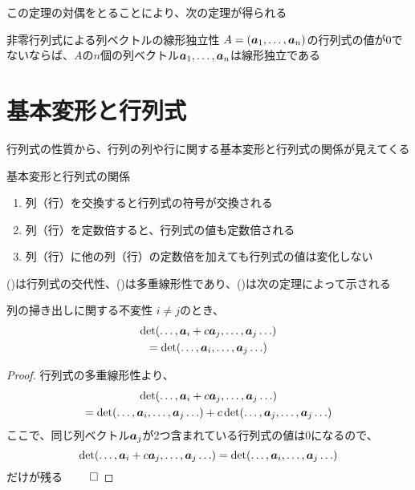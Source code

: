 \documentclass[../../../topic_linear-algebra]{subfiles}
\begin{document}
この定理の対偶をとることにより、次の定理が得られる

\begin{theorem}{非零行列式による列ベクトルの線形独立性}\label{thm:lin-indep-if-det-nonzero}
  $A = (\vb*{a}_1, \ldots, \vb*{a}_n)$の行列式の値が0でないならば、$A$の$n$個の列ベクトル$\vb*{a}_1, \ldots, \vb*{a}_n$は線形独立である
\end{theorem}

\sectionline
\section{基本変形と行列式}

行列式の性質から、行列の列や行に関する基本変形と行列式の関係が見えてくる

\begin{theorem}{基本変形と行列式の関係}
  \begin{enumerate}[label=\romanlabel]
    \item 列（行）を交換すると行列式の符号が交換される
    \item 列（行）を定数倍すると、行列式の値も定数倍される
    \item 列（行）に他の列（行）の定数倍を加えても行列式の値は変化しない
  \end{enumerate}
\end{theorem}

()は行列式の交代性、()は多重線形性であり、()は次の定理によって示される

\begin{theorem}{列の掃き出しに関する不変性}
  $i \neq j$のとき、
  \begin{multline*}
    \det(\ldots, \vb*{a}_i + c \vb*{a}_j,\ldots, \vb*{a}_j \ldots) \\= \det(\ldots, \vb*{a}_i,\ldots, \vb*{a}_j \ldots)
  \end{multline*}
\end{theorem}

\begin{proof}
  行列式の多重線形性より、
  \begin{multline*}
    \det(\ldots, \vb*{a}_i + c \vb*{a}_j,\ldots, \vb*{a}_j \ldots) \\
    = \det(\ldots, \vb*{a}_i,\ldots, \vb*{a}_j \ldots) + c\det(\ldots, \vb*{a}_j,\ldots, \vb*{a}_j \ldots)
  \end{multline*}
  ここで、同じ列ベクトル$\vb*{a}_j$が2つ含まれている行列式の値は0になるので、
  \begin{equation*}
    \det(\ldots, \vb*{a}_i + c \vb*{a}_j,\ldots, \vb*{a}_j \ldots) = \det(\ldots, \vb*{a}_i,\ldots, \vb*{a}_j \ldots)
  \end{equation*}
  だけが残る $\qed$
\end{proof}
\end{document}
